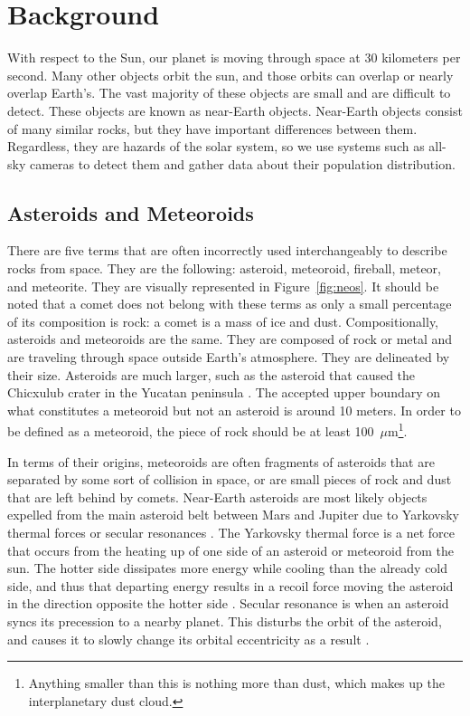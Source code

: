 \chapter{Background}
With respect to the Sun, our planet is moving through space at 30 kilometers per second. Many other objects orbit the sun, and those orbits can overlap or nearly overlap Earth's. The vast majority of these objects are small and are difficult to detect. These objects are known as near-Earth objects. Near-Earth objects consist of many similar rocks, but they have important differences between them. Regardless, they are hazards of the solar system, so we use systems such as all-sky cameras to detect them and gather data about their population distribution.

\section{Asteroids and Meteoroids}
There are five terms that are often incorrectly used interchangeably to describe rocks from space. They are the following: asteroid, meteoroid, fireball, meteor, and meteorite. They are visually represented in Figure~\ref{fig:neos}. It should be noted that a comet does not belong with these terms as only a small percentage of its composition is rock: a comet is a mass of ice and dust. Compositionally, asteroids and meteoroids are the same. They are composed of rock or metal and are traveling through space outside Earth's atmosphere. They are delineated by their size. Asteroids are much larger, such as the asteroid that caused the Chicxulub crater in the Yucatan peninsula \cite{Bottke2007}. The accepted upper boundary on what constitutes a meteoroid but not an asteroid is around 10 meters. In order to be defined as a meteoroid, the piece of rock should be at least \mbox{100 $\mu$m}\footnote{Anything smaller than this is nothing more than dust, which makes up the interplanetary dust cloud.}\cite{Steel1996}. 

In terms of their origins, meteoroids are often fragments of asteroids that are separated by some sort of collision in space, or are small pieces of rock and dust that are left behind by comets. Near-Earth asteroids are most likely objects expelled from the main asteroid belt between Mars and Jupiter due to Yarkovsky thermal forces or secular resonances \cite{Bottke2007}. The Yarkovsky thermal force is a net force that occurs from the heating up of one side of an asteroid or meteoroid from the sun. The hotter side dissipates more energy while cooling than the already cold side, and thus that departing energy results in a recoil force moving the asteroid in the direction opposite the hotter side \cite{Bottke2006}. Secular resonance is when an asteroid syncs its precession to a nearby planet. This disturbs the orbit of the asteroid, and causes it to slowly change its orbital eccentricity as a result \cite{Moons1995}.

